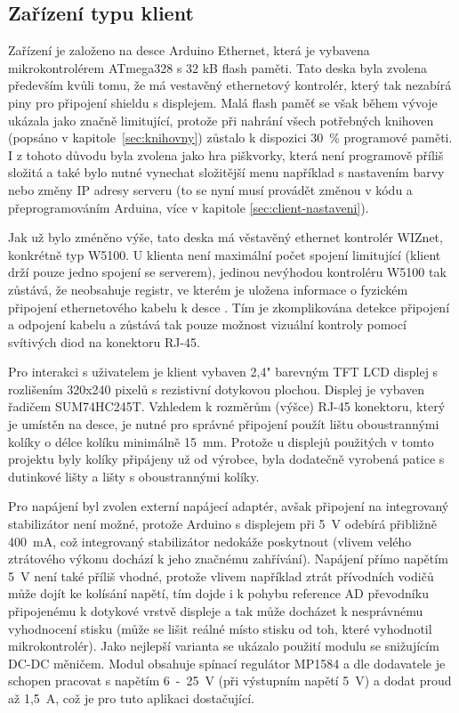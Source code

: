 \subsection{Zařízení typu klient}
\label{sec:HWclient}
Zařízení je založeno na desce Arduino Ethernet, která je vybavena mikrokontrolérem ATmega328 s 32 kB flash paměti. Tato deska byla zvolena především kvůli tomu, že má vestavěný ethernetový kontrolér, který tak nezabírá piny pro připojení shieldu s displejem. Malá flash paměť se však během vývoje ukázala jako značně limitující, protože při nahrání všech potřebných knihoven (popsáno v kapitole~\ref{sec:knihovny}) zůstalo k dispozici 30~\% programové paměti. I z tohoto důvodu byla zvolena jako hra piškvorky, která není programově příliš složitá a také bylo nutné vynechat složitější menu například s nastavením barvy nebo změny IP adresy serveru (to se nyní musí provádět změnou v kódu a přeprogramováním Arduina, více v kapitole \ref{sec:client-nastaveni}).

Jak už bylo zméněno výše, tato deska má věstavěný ethernet kontrolér WIZnet, konkrétně typ W5100. U klienta není maximální počet spojení limitující (klient drží pouze jedno spojení se serverem), jedinou nevýhodou kontroléru W5100 tak zůstává, že neobsahuje registr, ve kterém je uložena informace o fyzickém připojení ethernetového kabelu k desce \cite{datasheet_w5100}. Tím je zkomplikována detekce připojení a odpojení kabelu a zůstává tak pouze možnost vizuální kontroly pomocí svítivých diod na konektoru RJ-45.

Pro interakci s uživatelem je klient vybaven 2,4" barevným TFT LCD displej s rozlišením 320x240 pixelů s rezistivní dotykovou plochou. Displej je vybaven  řadičem SUM74HC245T. Vzhledem k rozměrům (výšce) RJ-45 konektoru, který je umístěn na desce, je nutné pro správné připojení použít lištu oboustrannými kolíky o délce kolíku minimálně 15~mm. Protože u displejů použitých v tomto projektu byly kolíky připájeny už od výrobce, byla dodatečně vyrobená patice s dutinkové lišty a lišty s oboustrannými kolíky.

Pro napájení byl zvolen externí napájecí adaptér, avšak připojení na integrovaný stabilizátor není možné, protože Arduino s displejem při 5~V odebírá přibližně 400~mA, což integrovaný stabilizátor nedokáže poskytnout (vlivem velého ztrátového výkonu dochází k jeho značnému zahřívání). Napájení přímo napětím 5~V není také příliš vhodné, protože vlivem například ztrát přívodních vodičů může dojít ke kolísání napětí, tím dojde i k pohybu reference AD převodníku připojenému k dotykové vrstvě displeje a tak může docházet k nesprávnému vyhodnocení stisku (může se lišit reálné místo stisku od toh, které vyhodnotil mikrokontrolér). Jako nejlepší varianta se ukázalo použití modulu se snižujícím DC-DC měničem. Modul obsahuje spínací regulátor MP1584 a dle dodavatele je schopen pracovat s napětím 6~-~25~V (při výstupním napětí 5~V) a dodat proud až 1,5~A, což je pro tuto aplikaci dostačující.

